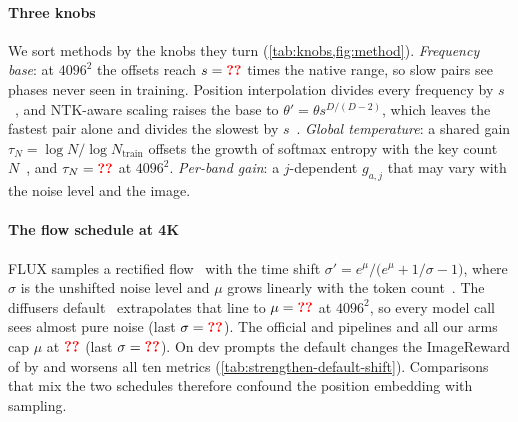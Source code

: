 \paragraph{Three knobs}
We sort methods by the knobs they turn (\cref{tab:knobs,fig:method}). \emph{Frequency base}: at $4096^2$ the offsets reach $s=\N{c@s}$ times the native range, so slow pairs see phases never seen in training. Position interpolation divides every frequency by $s$~\citep{chen2023pi}, and NTK-aware scaling raises the base to $\theta'=\theta s^{D/(D-2)}$, which leaves the fastest pair alone and divides the slowest by $s$~\citep{bloc97ntk}. \emph{Global temperature}: a shared gain $\tau_N=\log N/\log N_{\mathrm{train}}$ offsets the growth of softmax entropy with the key count $N$~\citep{jin2023training}, and $\tau_N=\N{c@taulogn}$ at $4096^2$. \emph{Per-band gain}: a $j$-dependent $g_{a,j}$ that may vary with the noise level and the image.

\paragraph{The flow schedule at 4K}
FLUX samples a rectified flow~\citep{lipman2023flow,liu2023flow} with the time shift $\sigma'=e^{\mu}/\bigl(e^{\mu}+1/\sigma-1\bigr)$, where $\sigma$ is the unshifted noise level and $\mu$ grows linearly with the token count~\citep{esser2024sd3}. The diffusers default~\citep{vonplaten2022diffusers} extrapolates that line to $\mu=\N{c@mudefault}$ at $4096^2$, so every model call sees almost pure noise (last $\sigma=\N{c@sigmalastdefault}$). The official \dype{} and \sega{} pipelines and all our arms cap $\mu$ at $\N{c@muofficial}$ (last $\sigma=\N{c@sigmalastofficial}$). On  dev prompts the default changes the ImageReward of \segaofficial{} by   and worsens all ten metrics (\cref{tab:strengthen-default-shift}). Comparisons that mix the two schedules therefore confound the position embedding with sampling.
